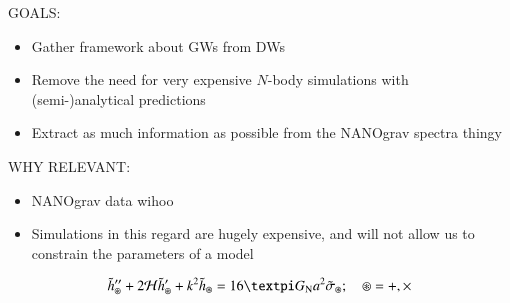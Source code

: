 


\begin{bullets}
    \item GOALS: \begin{itemize}
        \item Gather framework about GWs from DWs
        \item Remove the need for very expensive $N$-body simulations with (semi-)analytical predictions
        \item Extract as much information as possible from the NANOgrav spectra thingy
    \end{itemize}
    \item WHY RELEVANT: \begin{itemize}
        \item NANOgrav data wihoo
        \item Simulations in this regard are hugely expensive, and will not allow us to constrain the parameters of a model
    \end{itemize}
\end{bullets}














\begin{equation}
    \tilde{h}^{\prime \prime}_\circledast + 2\mathcal{H}\tilde{h}^{\prime}_\circledast + k^2 \tilde{h}_\circledast = 16\ppi G\ped{N} a^2 \tilde{\sigma}_\circledast; \quad \circledast = +, \times
\end{equation}





